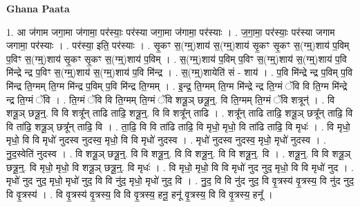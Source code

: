 \documentclass[17pt]{extarticle}
\begin{document}
\textbf{Ghana Paata } \newline

1. आ ज॑गाम जगा॒मा ज॑गामा॒ पर॑स्याः॒ पर॑स्या जगा॒मा ज॑गामा॒ पर॑स्याः । . ज॒गा॒मा॒ पर॑स्याः॒ पर॑स्या जगाम जगामा॒ पर॑स्याः । . पर॑स्या॒ इति॒ पर॑स्याः । . सृ॒कꣳ स॒(ग्म्॒)शाय॑ स॒(ग्म्॒)शाय॑ सृ॒कꣳ सृ॒कꣳ स॒(ग्म्॒)शाय॑ प॒विम् प॒विꣳ स॒(ग्म्॒)शाय॑ सृ॒कꣳ सृ॒कꣳ स॒(ग्म्॒)शाय॑ प॒विम् । . स॒(ग्म्॒)शाय॑ प॒विम् प॒विꣳ स॒(ग्म्॒)शाय॑ स॒(ग्म्॒)शाय॑ प॒वि मि॑न्द्रे न्द्र प॒विꣳ स॒(ग्म्॒)शाय॑ स॒(ग्म्॒)शाय॑ प॒वि मि॑न्द्र । . स॒(ग्म्॒)शायेति॑ सं - शाय॑ । . प॒वि मि॑न्द्रे न्द्र प॒विम् प॒वि मि॑न्द्र ति॒ग्मम् ति॒ग्म मि॑न्द्र प॒विम् प॒वि मि॑न्द्र ति॒ग्मम् । . इ॒न्द्र॒ ति॒ग्मम् ति॒ग्म मि॑न्द्रे न्द्र ति॒ग्मं ॅवि वि ति॒ग्म मि॑न्द्रे न्द्र ति॒ग्मं ॅवि । . ति॒ग्मं ॅवि वि ति॒ग्मम् ति॒ग्मं ॅवि शत्रू॒ञ् छत्रू॒न्॒. वि ति॒ग्मम् ति॒ग्मं ॅवि शत्रून्॑ । . वि शत्रू॒ञ् छत्रू॒न्॒. वि वि शत्रू᳚न् ताढि ताढि॒ शत्रू॒न्॒. वि वि शत्रू᳚न् ताढि । . शत्रू᳚न् ताढि ताढि॒ शत्रू॒ञ् छत्रू᳚न् ताढि॒ वि वि ता॑ढि॒ शत्रू॒ञ् छत्रू᳚न् ताढि॒ वि । . ता॒ढि॒ वि वि ता॑ढि ताढि॒ वि मृधो॒ मृधो॒ वि ता॑ढि ताढि॒ वि मृधः॑ । . वि मृधो॒ मृधो॒ वि वि मृधो॑ नुदस्व नुदस्व॒ मृधो॒ वि वि मृधो॑ नुदस्व । . मृधो॑ नुदस्व नुदस्व॒ मृधो॒ मृधो॑ नुदस्व । . नु॒द॒स्वेति॑ नुदस्व । . वि शत्रू॒ञ् छत्रू॒न्॒. वि वि शत्रू॒न्॒. वि वि शत्रू॒न्॒. वि वि शत्रू॒न्॒. वि । . शत्रू॒न्॒. वि वि शत्रू॒ञ् छत्रू॒न्॒. वि मृधो॒ मृधो॒ वि शत्रू॒ञ् छत्रू॒न्॒. वि मृधः॑ । . वि मृधो॒ मृधो॒ वि वि मृधो॑ नुद नुद॒ मृधो॒ वि वि मृधो॑ नुद । . मृधो॑ नुद नुद॒ मृधो॒ मृधो॑ नुद॒ वि वि नु॑द॒ मृधो॒ मृधो॑ नुद॒ वि । . नु॒द॒ वि वि नु॑द नुद॒ वि वृ॒त्रस्य॑ वृ॒त्रस्य॒ वि नु॑द नुद॒ वि वृ॒त्रस्य॑ । . वि वृ॒त्रस्य॑ वृ॒त्रस्य॒ वि वि वृ॒त्रस्य॒ हनू॒ हनू॑ वृ॒त्रस्य॒ वि वि वृ॒त्रस्य॒ हनू᳚ । \newline
\end{document}
